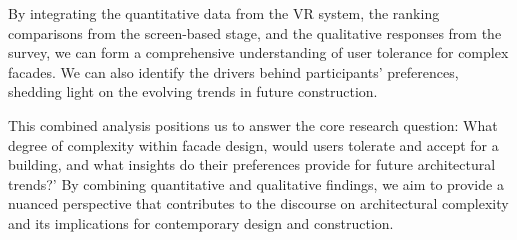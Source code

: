 By integrating the quantitative data from the VR system, the ranking comparisons from the screen-based stage, and the qualitative responses from the survey, we can form a comprehensive understanding of user tolerance for complex facades.
We can also identify the drivers behind participants' preferences, shedding light on the evolving trends in future construction.

This combined analysis positions us to answer the core research question: What degree of complexity within facade design, would users tolerate and accept for a building, and what insights do their preferences provide for future architectural trends?' By combining quantitative and qualitative findings, we aim to provide a nuanced perspective that contributes to the discourse on architectural complexity and its implications for contemporary design and construction.

